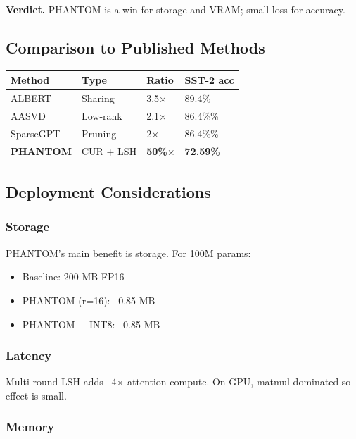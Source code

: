 \textbf{Verdict.} PHANTOM is a win for storage and VRAM; small loss for accuracy.

\subsection{Comparison to Published Methods}

\begin{table}[H]
\centering
\small
\begin{tabular}{llll}
\toprule
\textbf{Method} & \textbf{Type} & \textbf{Ratio} & \textbf{SST-2 acc} \\
\midrule
ALBERT & Sharing & 3.5$\times$ & 89.4\% \\
AASVD & Low-rank & 2.1$\times$ & 86.4\%\% \\
SparseGPT & Pruning & 2$\times$ & 86.4\%\% \\
\textbf{PHANTOM} & CUR + LSH & \textbf{50\%$\times$} & \textbf{72.59\%} \\
\bottomrule
\end{tabular}
\end{table}

\subsection{Deployment Considerations}

\subsubsection{Storage}

PHANTOM's main benefit is storage. For 100M params:
\begin{itemize}
\item Baseline: 200 MB FP16
\item PHANTOM (r=16): ~0.85 MB
\item PHANTOM + INT8: ~0.85 MB

\end{itemize}
\subsubsection{Latency}

Multi-round LSH adds ~4$\times$ attention compute. On GPU, matmul-dominated so 
effect is small.

\subsubsection{Memory}

